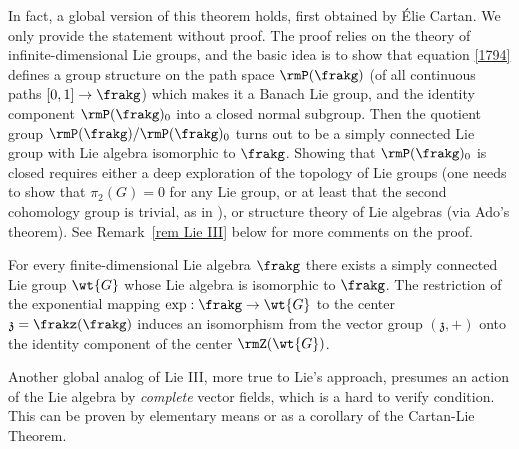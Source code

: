 In fact, a global version of this theorem holds, first obtained by \'Elie Cartan. We only provide the statement without proof. The proof relies on the theory of infinite-dimensional Lie groups, and the basic idea is to show that equation \eqref{1794} defines a group structure on the path space $\rmP(\frakg)$ (of all continuous paths $[0,1]\to \frakg$) which makes it a Banach Lie group, and the identity component $\rmP(\frakg)_0$ into a closed normal subgroup. Then the quotient group $\rmP(\frakg)/\rmP(\frakg)_0$ turns out to be a simply connected Lie group with Lie algebra isomorphic to $\frakg$. Showing that $\rmP(\frakg)_0$ is closed requires either a deep exploration of the topology of Lie groups (one needs to show that $\pi_2(G)=0$ for any Lie group, or at least that the second cohomology group is trivial, as in \cite{DK}), or structure theory of Lie algebras (via Ado's theorem). See Remark~\ref{rem Lie III} below for more comments on the proof.

\begin{thm}\label{thm 1.14.3 DK global Lie's third}
    For every finite-dimensional Lie algebra $\frakg$ there exists a simply connected Lie group $\wt{G}$ whose Lie algebra is isomorphic to $\frakg$. The restriction of the exponential mapping $\exp:\frakg\to\wt{G}$ to the center $\mathfrak{z}=\frakz(\frakg)$ induces an isomorphism from the vector group $(\mathfrak{z},+)$ onto the identity component of the center $\rmZ(\wt{G})$.
\end{thm}

Another global analog of Lie III, more true to Lie's approach, presumes an action of the Lie algebra by \emph{complete} vector fields, which is a hard to verify condition. This can be proven by elementary means or as a corollary of the Cartan-Lie Theorem.

